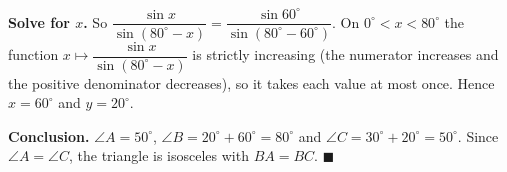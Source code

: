 \textbf{Solve for $x$.} So $\dfrac{\sin x}{\sin(80^\circ-x)}=\dfrac{\sin60^\circ}{\sin(80^\circ-60^\circ)}$. On $0^\circ<x<80^\circ$ the function $x\mapsto\dfrac{\sin x}{\sin(80^\circ-x)}$ is strictly increasing (the numerator increases and the positive denominator decreases), so it takes each value at most once. Hence $x=60^\circ$ and $y=20^\circ$.

\textbf{Conclusion.} $\angle A=50^\circ$, $\angle B=20^\circ+60^\circ=80^\circ$ and $\angle C=30^\circ+20^\circ=50^\circ$. Since $\angle A=\angle C$, the triangle is isosceles with $BA=BC$. $\blacksquare$
